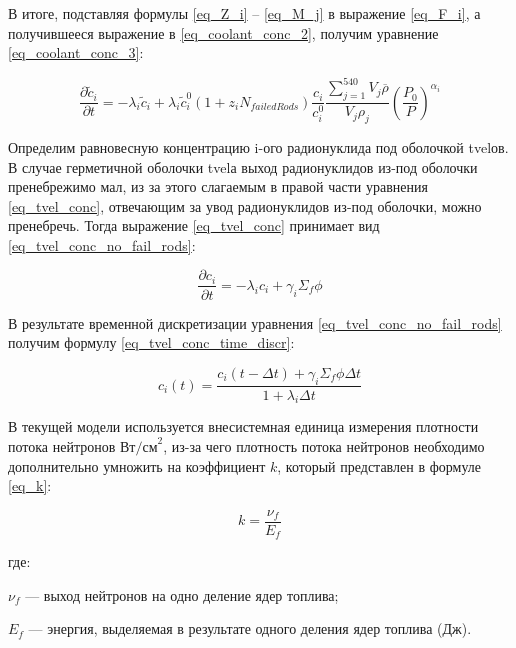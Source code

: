 В итоге, подставляя формулы \ref{eq_Z_i} -- \ref{eq_M_j} в выражение \ref{eq_F_i}, а получившееся выражение в 
\ref{eq_coolant_conc_2}, получим уравнение \ref{eq_coolant_conc_3}:

\begin{equation}
    \label{eq_coolant_conc_3}
    \frac{\partial \widetilde{c}_{i}}{\partial t} = -\lambda_{i}\widetilde{c}_{i} + \lambda_{i}\widetilde{c}_{i}^{0}
        (1 + z_{i}N_{failedRods})\frac{c_{i}}{c_{i}^{0}}\frac{\sum_{j=1}^{540} V_{j}\overline{\rho}}{V_{j}\rho_{j}}
        (\frac{P_{0}}{P})^{\alpha_{i}}
\end{equation}

Определим равновесную концентрацию i-ого радионуклида под оболочкой \ac{tvel}ов. В случае герметичной оболочки 
\ac{tvel}а выход радионуклидов из-под оболочки пренебрежимо мал, из за этого слагаемым в правой части уравнения 
\ref{eq_tvel_conc}, отвечающим за увод радионуклидов из-под оболочки, можно пренебречь. Тогда выражение 
\ref{eq_tvel_conc} принимает вид \ref{eq_tvel_conc_no_fail_rods}: 

\begin{equation}
    \label{eq_tvel_conc_no_fail_rods}
    \frac{\partial c_{i}}{\partial t} = -\lambda_{i}c_{i} + \gamma_{i}\Sigma_{f}\phi
\end{equation}

В результате временной дискретизации уравнения \ref{eq_tvel_conc_no_fail_rods} получим формулу \ref{eq_tvel_conc_time_discr}:

\begin{equation}
    \label{eq_tvel_conc_time_discr}
    c_{i}(t) = \frac{c_{i}(t - \Delta t) + \gamma_{i} \Sigma_{f} \phi \Delta t}{1 + \lambda_{i} \Delta t}
\end{equation}

В текущей модели используется внесистемная единица измерения плотности потока нейтронов $\text{Вт/см}^{2}$, из-за чего 
плотность потока нейтронов необходимо дополнительно умножить на коэффициент $k$, который представлен в формуле 
\ref{eq_k}:

\begin{equation}
    \label{eq_k}
    k = \frac{\nu_{f}}{E_{f}}
\end{equation}

где:
\begin{description}
    \item $\nu_{f}$ --- выход нейтронов на одно деление ядер топлива;
    \item $E_{f}$ --- энергия, выделяемая в результате одного деления ядер топлива (Дж).
\end{description}

